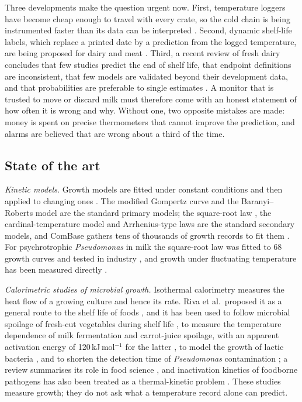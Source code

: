 Three developments make the question urgent now. First, temperature loggers have become cheap enough to travel with every crate, so the cold chain is being instrumented faster than its data can be interpreted \cite{badiamelis2018,mercier2017,jedermann2014}. Second, dynamic shelf-life labels, which replace a printed date by a prediction from the logged temperature, are being proposed for dairy and meat \cite{koutsoumanis2005,goransson2018,kim2020}. Third, a recent review of fresh dairy concludes that few studies predict the end of shelf life, that endpoint definitions are inconsistent, that few models are validated beyond their development data, and that probabilities are preferable to single estimates \cite{lima2026}. A monitor that is trusted to move or discard milk must therefore come with an honest statement of how often it is wrong and why. Without one, two opposite mistakes are made: money is spent on precise thermometers that cannot improve the prediction, and alarms are believed that are wrong about a third of the time.

\subsection{State of the art}\label{sec:prior}
\textit{Kinetic models.} Growth models are fitted under constant conditions and then applied to changing ones \cite{perez2013,corradini2005}. The modified Gompertz curve \cite{gompertz1825,zwietering1990} and the Baranyi--Roberts model \cite{baranyi1993,baranyi1994} are the standard primary models; the square-root law \cite{ratkowsky1982}, the cardinal-temperature model \cite{rosso1993} and Arrhenius-type laws are the standard secondary models, and ComBase gathers tens of thousands of growth records to fit them \cite{baranyi2004,combase}. For psychrotrophic \textit{Pseudomonas} in milk the square-root law was fitted to 68 growth curves and tested in industry \cite{neumeyer1995,neumeyer1997a}, and growth under fluctuating temperature has been measured directly \cite{lin2016,zwietering1994}.

\textit{Calorimetric studies of microbial growth.} Isothermal calorimetry measures the heat flow of a growing culture and hence its rate. Riva et al.\ proposed it as a general route to the shelf life of foods \cite{riva2001}, and it has been used to follow microbial spoilage of fresh-cut vegetables during shelf life \cite{haman2019}, to measure the temperature dependence of milk fermentation and carrot-juice spoilage, with an apparent activation energy of 120\,kJ\,mol$^{-1}$ for the latter \cite{wadso2011}, to model the growth of lactic bacteria \cite{fessas2017}, and to shorten the detection time of \textit{Pseudomonas} contamination \cite{fricke2020}; a review summarises its role in food science \cite{schiraldi2019}, and inactivation kinetics of foodborne pathogens has also been treated as a thermal-kinetic problem \cite{juneja2011}. These studies measure growth; they do not ask what a temperature record alone can predict.

